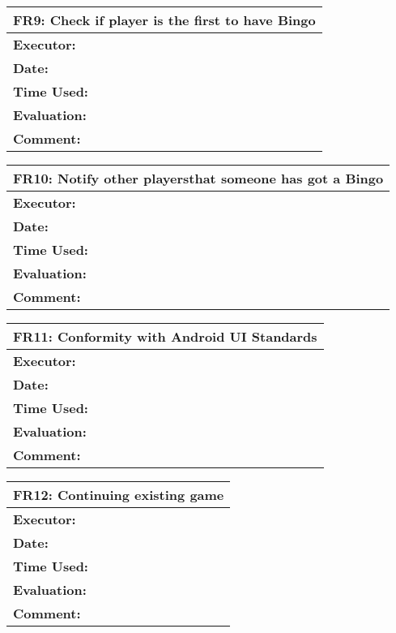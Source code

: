 \begin{tabular}{|m{}||m{}|}
\hline
\multicolumn{2}{|l|}{FR9: Check if player is the first to have Bingo} \\ \hline
\textbf{Executor:} & \\ \hline
\textbf{Date:} & \\ \hline
\textbf{Time Used:} & \\ \hline
\textbf{Evaluation:} & \\ \hline
\textbf{Comment:} & \\ \hline
\end{tabular}

\begin{tabular}{|m{}||m{}|}
\hline
\multicolumn{2}{|l|}{FR10: Notify other playersthat someone has got a Bingo} \\ \hline
\textbf{Executor:} & \\ \hline
\textbf{Date:} & \\ \hline
\textbf{Time Used:} & \\ \hline
\textbf{Evaluation:} & \\ \hline
\textbf{Comment:} & \\ \hline
\end{tabular}

\begin{tabular}{|m{}||m{}|}
\hline
\multicolumn{2}{|l|}{FR11: Conformity with Android UI Standards} \\ \hline
\textbf{Executor:} & \\ \hline
\textbf{Date:} & \\ \hline
\textbf{Time Used:} & \\ \hline
\textbf{Evaluation:} & \\ \hline
\textbf{Comment:} & \\ \hline
\end{tabular}

\begin{tabular}{|m{}||m{}|}
\hline
\multicolumn{2}{|l|}{FR12: Continuing existing game} \\ \hline
\textbf{Executor:} & \\ \hline
\textbf{Date:} & \\ \hline
\textbf{Time Used:} & \\ \hline
\textbf{Evaluation:} & \\ \hline
\textbf{Comment:} & \\ \hline
\end{tabular}

